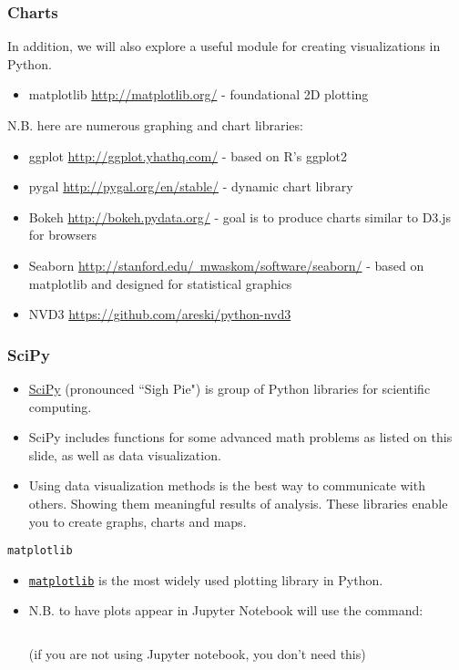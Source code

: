 \documentclass[xcolor=svgnames, colorlinks, handout]{beamer}
\newcommand{\nl}{\\[1em]}
\newcommand{\ft}[1]{\frametitle{#1}}
\begin{document}
\begin{frame}[fragile]\ft{Charts}
In addition, we will also explore a useful module for creating visualizations in Python.
\begin{itemize}
\item matplotlib \href{http://matplotlib.org/}{http://matplotlib.org/} - foundational 2D plotting
\end{itemize}
\vfill
N.B. here are numerous graphing and chart libraries:
\begin{itemize}
\item ggplot \href{http://ggplot.yhathq.com/}{http://ggplot.yhathq.com/} - based on R's ggplot2
\item pygal \href{http://pygal.org/en/stable/}{http://pygal.org/en/stable/} - dynamic chart library
\item Bokeh \href{http://bokeh.pydata.org/}{http://bokeh.pydata.org/} -  goal is to produce charts similar to D3.js for browsers
\item Seaborn \href{http://stanford.edu/~mwaskom/software/seaborn/}{http://stanford.edu/~mwaskom/software/seaborn/} - based on matplotlib and designed for statistical graphics
\item NVD3 \href{https://github.com/areski/python-nvd3}{https://github.com/areski/python-nvd3}
\end{itemize}
\vfill
\end{frame}

\begin{frame}\ft{SciPy}
\begin{itemize}
\vfill
\item \href{https://www.scipy.org/}{SciPy} (pronounced ``Sigh Pie") is group of Python libraries for scientific computing.
\vfill
\item  SciPy includes functions for some advanced math problems as listed on this slide, as well as data visualization.
\vfill
\item  Using data visualization methods is the best way to communicate with others. Showing them meaningful results of analysis. These libraries enable you to create graphs, charts and maps. 
\end{itemize}

\end{frame}

%
\begin{frame}[fragile]{\tt matplotlib}
\begin{itemize}
\item \href{https://matplotlib.org/}{\tt matplotlib} is the most widely used plotting library in Python.\nl

\item N.B.  to have plots appear in Jupyter Notebook will use the command: 
\begin{Verbatim}[frame=single]
%matplotlib inline
\end{Verbatim}
 (if you are not using Jupyter notebook, you don't need this)\nl
\end{itemize}
\end{frame}
\end{document}
